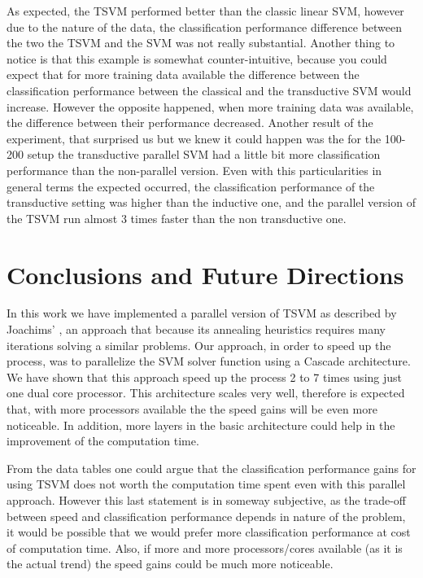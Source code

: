 As expected, the TSVM performed better than the classic linear SVM,
however due to the nature of the data, the classification performance
difference between the two the TSVM and the SVM was not really substantial.
Another thing to notice is that this example is somewhat counter-intuitive,
because you could expect that for more training data available the
difference between the classification performance between the classical
and the transductive SVM would increase. However the opposite happened,
when more training data was available, the difference between their
performance decreased. Another result of the experiment, that surprised
us but we knew it could happen was the for the 100-200 setup the transductive
parallel SVM had a little bit more classification performance than
the non-parallel version. Even with this particularities in general
terms the expected occurred, the classification performance of the
transductive setting was higher than the inductive one, and the parallel
version of the TSVM run almost 3 times faster than the non transductive
one.

\section{Conclusions and Future Directions}

In this work we have implemented a parallel version of TSVM as described
by Joachims' \cite{Joachims99c}, an approach that because its annealing
heuristics requires many iterations solving a similar problems. Our
approach, in order to speed up the process, was to parallelize the
SVM solver function using a Cascade architecture. We have shown that
this approach speed up the process 2 to 7 times using just one dual
core processor. This architecture scales very well, therefore is expected
that, with more processors available the the speed gains will be even
more noticeable. In addition, more layers in the  basic architecture could
help in the improvement of the computation time. 

From the data tables one could argue that the classification performance
gains for using TSVM does not worth the computation time spent even
with this parallel approach. However this last statement is in someway
subjective, as the trade-off between speed and classification performance
depends in nature of the problem, it would be possible that we would
prefer more classification performance at cost of computation time.
Also, if more and more processors/cores available (as it is the actual
trend) the speed gains could be much more noticeable. 

